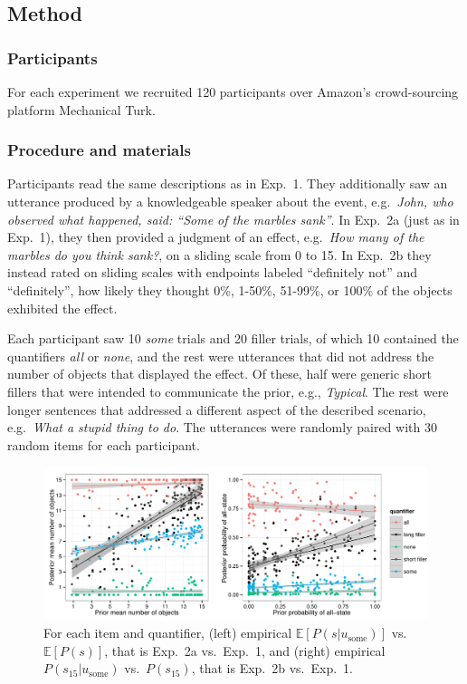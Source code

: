 \documentclass[10pt,letterpaper]{article}
\begin{document}
\subsection{Method}

\subsubsection{Participants}
For each experiment we recruited 120 participants over Amazon's crowd-sourcing platform Mechanical Turk.

\subsubsection{Procedure and materials}

Participants read the same descriptions as in Exp.~1. They additionally saw an utterance produced by a knowledgeable speaker about the event, e.g.~\textit{John, who observed what happened, said: ``Some of the marbles sank''}. In Exp.~2a (just as in Exp.~1), they then provided a judgment of an effect, e.g.~\textit{How many of the marbles do you think sank?}, on a sliding scale from 0 to 15. In Exp.~2b they instead rated on sliding scales with endpoints labeled ``definitely not'' and ``definitely'', how likely they thought 0\%, 1-50\%, 51-99\%, or 100\% of the objects exhibited the effect.

Each participant saw 10 \emph{some} trials and 20 filler trials, of which 10 contained the quantifiers \emph{all} or \emph{none}, and the rest were utterances that did not address the number of objects that displayed the effect. Of these, half were generic short fillers that were intended to communicate the prior, e.g., \emph{Typical}. The rest were longer sentences that addressed a different aspect of the described scenario, e.g.~\emph{What a stupid thing to do}. The utterances were randomly paired with 30 random items for each participant.

 
\begin{figure}
	\includegraphics[width=\textwidth]{pics/empirical-results}	
	\caption{For each item and quantifier, (left) empirical $\mathbb{E}[P(s|u_{\textrm{some}})]$ vs. $\mathbb{E}[P(s)]$, that is Exp.~2a vs.~Exp.~1,  and (right) empirical $P(s_{15}|u_{\textrm{some}})$ vs.~$P(s_{15})$, that is Exp.~2b vs.~Exp.~1.}
	\label{fig:empiricalresults}	
\end{figure}
\end{document}
